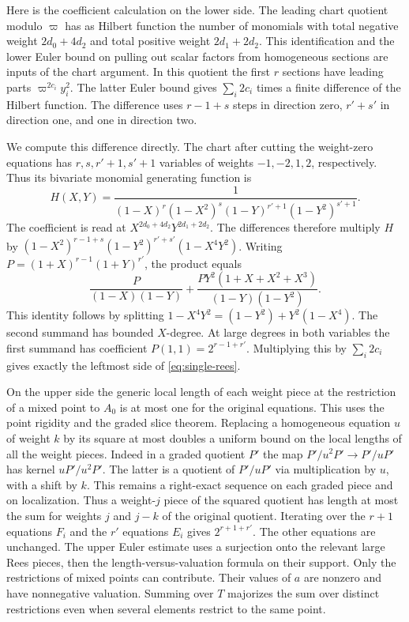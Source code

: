 Here is the coefficient calculation on the lower side. The leading
chart quotient modulo \(\varpi\) has as Hilbert function the number
of monomials with total negative weight \(2d_0+4d_2\) and total
positive weight \(2d_1+2d_2\). This identification and the lower
Euler bound on pulling out scalar factors from homogeneous sections
are inputs of the chart argument. In this quotient the first \(r\)
sections have leading parts \(\varpi^{2c_i}y_i^2\). The latter Euler
bound gives \(\sum_i2c_i\) times a finite difference of the Hilbert
function. The difference uses \(r-1+s\) steps in direction zero,
\(r'+s'\) in direction one, and one in direction two.

We compute this difference directly. The chart after cutting the
weight-zero equations has \(r,s,r'+1,s'+1\) variables of weights
\(-1,-2,1,2\), respectively. Thus its bivariate monomial generating
function is
\[
 H(X,Y)=\frac{1}{(1-X)^r(1-X^2)^s(1-Y)^{r'+1}(1-Y^2)^{s'+1}} .
\]
The coefficient is read at \(X^{2d_0+4d_2}Y^{2d_1+2d_2}\).
The differences therefore multiply \(H\) by
\((1-X^2)^{r-1+s}(1-Y^2)^{r'+s'}(1-X^4Y^2)\).
Writing \(P=(1+X)^{r-1}(1+Y)^{r'}\), the product equals
\[
 \frac{P}{(1-X)(1-Y)}
   +\frac{PY^2(1+X+X^2+X^3)}{(1-Y)(1-Y^2)} .
\]
This identity follows by splitting \(1-X^4Y^2=(1-Y^2)+Y^2(1-X^4)\).
The second summand has bounded \(X\)-degree. At large degrees in
both variables the first summand has coefficient
\(P(1,1)=2^{r-1+r'}\). Multiplying this by \(\sum_i2c_i\)
gives exactly the leftmost side of \eqref{eq:single-rees}.

On the upper side the generic local length of each weight piece at
the restriction of a mixed point to \(A_0\) is at most one for the
original equations. This uses the point rigidity and the graded
slice theorem. Replacing a homogeneous equation \(u\) of weight
\(k\) by its square at most doubles a uniform bound on the local
lengths of all the weight pieces. Indeed in a graded quotient \(P'\)
the map \(P'/u^2P'\to P'/uP'\) has kernel \(uP'/u^2P'\). The latter
is a quotient of \(P'/uP'\) via multiplication by \(u\), with a
shift by \(k\). This remains a right-exact sequence on each graded
piece and on localization. Thus a weight-\(j\) piece of the squared
quotient has length at most the sum for weights \(j\) and \(j-k\)
of the original quotient. Iterating over the \(r+1\) equations \(F_i\)
and the \(r'\) equations \(E_i\) gives \(2^{r+1+r'}\). The other
equations are unchanged. The upper Euler estimate uses a surjection
onto the relevant large Rees pieces, then the length-versus-valuation
formula on their support. Only the restrictions of mixed points can
contribute. Their values of \(a\) are nonzero and have nonnegative
valuation. Summing over \(T\) majorizes the sum over distinct
restrictions even when several elements restrict to the same point.

